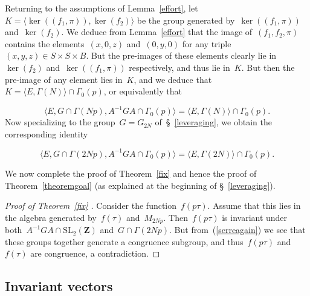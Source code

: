 \documentclass[10pt]{amsart}
\def\SSSS{\S}
\def\Z{\mathbf{Z}}
\theoremstyle{remark}
\numberwithin{equation}{subsection}
\def\numequation{\addtocounter{subsubsection}{1}\begin{equation}}
\def\SL{\mathrm{SL}}
\begin{document}
Returning to the assumptions of Lemma~\ref{effort},
let~$K = \langle \ker((f_1,\pi)), \ker(f_2) \rangle$ be the group generated by~$\ker((f_1,\pi))$ and~$\ker(f_2)$. We deduce from Lemma~\ref{effort} that
the image of~$(f_1,f_2,\pi)$ contains the elements~$(x,0,z)$ and~$(0,y,0)$ for any
triple~$(x,y,z) \in S \times S \times B$. But the pre-images of these elements
clearly lie in~$\ker(f_2)$ and~$\ker((f_1,\pi))$ respectively, and thus lie in~$K$. But then the pre-image of
any element lies in~$K$, and we deduce that~$K = \langle E,\Gamma(N) \rangle \cap \Gamma_0(p)$, or equivalently that
\numequation 
\label{serre}
\langle E,G \cap \Gamma(Np), A^{-1} G A  \cap \Gamma_0(p) \rangle = \langle E,\Gamma(N)\rangle \cap \Gamma_0(p).
\end{equation}
Now specializing to the group~$G = G_{2N}$ of~\S~\ref{leveraging}, we obtain the corresponding identity
\numequation 
\label{serreagain}
\langle E,G \cap \Gamma(2Np), A^{-1} G A  \cap \Gamma_0(p) \rangle = \langle E,\Gamma(2N)\rangle \cap \Gamma_0(p).
\end{equation}





We now complete the proof of Theorem~\ref{fix} and hence the proof of Theorem~\ref{theoremgoal}
(as explained at the beginning of \SSSS~\ref{leveraging}).

\begin{proof}[Proof of Theorem~\ref{fix} ] 
Consider the function~$f(p \tau)$.
Assume that this lies in the algebra generated by~$f(\tau)$ and~$M_{2Np}$.
Then~$f(p \tau)$
is invariant under both~$A^{-1}GA \cap \SL_2(\Z)$  and~$G \cap \Gamma(2Np)$.
But from~(\ref{serreagain}) we see that these groups together generate a congruence subgroup,
and thus~$f(p \tau)$ and~$f(\tau)$ are congruence, a contradiction.
\end{proof}


\subsection{Invariant vectors}
\label{invariant}
\end{document}
